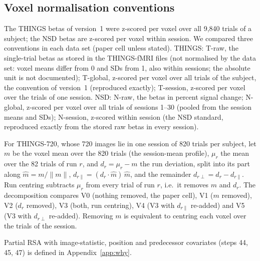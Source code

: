 \subsection{Voxel normalisation conventions}
\label{sec:convmethods}

The THINGS betas of version~1 were z-scored per voxel over all 9{,}840 trials of a subject; the NSD
betas are z-scored per voxel within session. We compared three conventions in each data set
(paper cell unless stated). THINGS: T-raw, the single-trial betas as stored in the THINGS-fMRI files
(not normalised by the data set: voxel means differ from 0 and SDs from 1, also within sessions;
the absolute unit is not documented); T-global, z-scored per voxel over all trials of the
subject, the convention of version~1 (reproduced exactly); T-session, z-scored per voxel over the
trials of one session. NSD: N-raw, the betas in percent signal change; N-global, z-scored per voxel
over all trials of sessions 1--30 (pooled from the session means and SDs); N-session, z-scored within
session (the NSD standard, reproduced exactly from the stored raw betas in every session).

For THINGS-720, whose 720 images lie in one session of 820 trials per subject, let $m$ be the voxel
mean over the 820 trials (the session-mean profile), $\mu_r$ the mean over the 82 trials of run
$r$, and $d_r = \mu_r - m$ the run deviation, split into its part along $\hat m = m / \lVert m \rVert$,
$d_{r\parallel} = (d_r \cdot \hat m)\, \hat m$, and the remainder $d_{r\perp} = d_r - d_{r\parallel}$.
Run centring subtracts $\mu_r$ from every trial of run $r$, i.e.\ it removes $m$ and $d_r$. The
decomposition compares V0 (nothing removed, the paper cell), V1 ($m$ removed), V2 ($d_r$ removed),
V3 (both, run centring), V4 (V3 with $d_{r\parallel}$ re-added) and V5 (V3 with $d_{r\perp}$
re-added). Removing $m$ is equivalent to centring each voxel over the trials of the session.

Partial RSA with image-statistic, position and predecessor covariates (steps 44, 45, 47) is defined in Appendix~\ref{app:why}.
